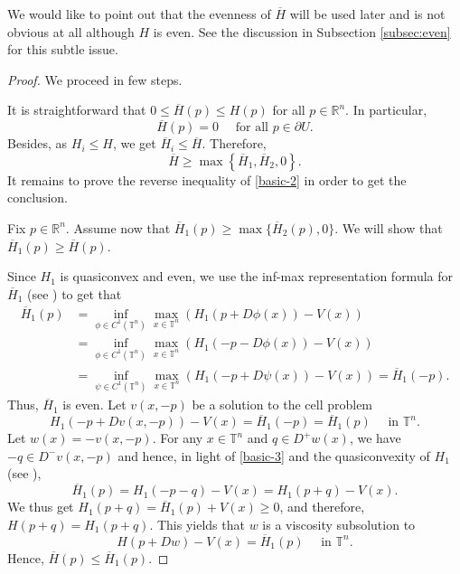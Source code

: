 \documentclass[12pt,reqno]{amsart}
\theoremstyle{plain}
\theoremstyle{remark}
\numberwithin{equation}{section}
\newcommand{\R}{\mathbb{R}}
\newcommand{\T}{\mathbb{T}}
\newcommand{\ol}{\overline}
\begin{document}
We would like to point out that the evenness of $ \ol{H}$ will be used later and is not  obvious at all  although $H$ is  even.  See the discussion in Subsection \ref{subsec:even} for this subtle issue. 


\begin{proof}
We proceed in few steps.
\smallskip

 It is straightforward that $0 \leq \ol{H}(p) \leq H(p)$ for all $p \in \R^n$. In particular, 
\begin{equation}\label{basic-1}
\ol{H}(p)=0 \quad \text{ for all } p \in \partial U.
\end{equation}
Besides, as $H_i \leq H$, we get $\ol{H}_i \leq \ol{H}$. Therefore, 
\begin{equation}\label{basic-2}
\ol{H} \geq \max\left\{\ol{H}_1, \ol{H}_2,0\right\}.
\end{equation}
It remains to prove the reverse inequality of \eqref{basic-2} in order to get the conclusion.
\smallskip

 Fix $p\in \R^n$. 
Assume now that $\ol{H}_1(p) \geq \max\{\ol{H}_2(p),   0\}$.
We will show that $\ol{H}_1(p) \geq \ol{H}(p)$.

 Since $H_1$ is quasiconvex and even, we use the inf-max representation formula for $\ol{H}_1$
 (see \cite{AS3,DaSi, Na}) to get that
\begin{align*}
\ol{H}_1(p) &= \inf_{\phi \in C^1(\T^n)} \max_{x \in \T^n} \left ( H_1(p+D\phi(x)) - V(x) \right)\\
&=\inf_{\phi \in C^1(\T^n)} \max_{x \in \T^n} \left ( H_1(-p-D\phi(x)) - V(x) \right)\\
&=\inf_{\psi \in C^1(\T^n)} \max_{x \in \T^n} \left ( H_1(-p+D\psi(x)) - V(x) \right)
=\ol{H}_1(-p).
\end{align*}
Thus, $\ol{H}_1$ is even.
Let $v(x,-p)$ be a solution to the cell problem
\begin{equation}\label{basic-3}
H_1(-p+Dv(x,-p)) - V(x) = \ol{H}_1(-p)=\ol{H}_1(p) \quad \text{ in } \T^n.
\end{equation}
Let $w(x)=-v(x,-p)$. For any $x\in \T^n$ and $q \in D^+ w(x)$, we have $-q \in D^- v(x,-p)$ and hence,
in light of \eqref{basic-3} and the quasiconvexity of $H_1$ (see \cite{BJ}),
\[
\ol{H}_1(p)=H_1(-p-q) - V(x) = H_1(p+q) - V(x).
\]
We thus get $H_1(p+q) = \ol{H}_1(p) + V(x) \geq 0$, and therefore, $H(p+q) = H_1(p+q)$.
This yields that $w$ is a viscosity subsolution to
\[
H(p+Dw) - V(x) = \ol{H}_1(p) \quad \text{ in } \T^n.
\]
Hence, $\ol{H}(p) \leq \ol{H}_1(p)$.
\smallskip


\end{proof}
\end{document}
